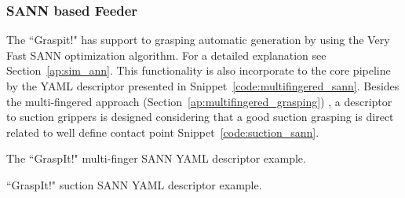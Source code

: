 \subsubsection{\acl{SANN} based Feeder}
\label{cap4:modular_grasping_architecture:sec:grasping_synthesis:subsec:graspit:subsubsec:sann}

The ``Graspit!" has support to grasping automatic generation by using the Very Fast \acl{SANN} optimization algorithm. For a detailed explanation see Section~\ref{ap:sim_ann}. This functionality is also incorporate to the core pipeline by the YAML descriptor presented in Snippet~\ref{code:multifingered_sann}. Besides the multi-fingered approach (Section~\ref{ap:multifingered_grasping}) , a descriptor to suction grippers is designed considering that a good suction grasping is direct related to well define contact point Snippet~\ref{code:suction_sann}.

\begin{snippet}[h!]
\centering
{}
\caption{The ``GraspIt!" multi-finger \ac{SANN} YAML descriptor example.}
\label{code:multifingered_sann}
\end{snippet}


\begin{snippet}[h!]
\centering
{}
\caption{``GraspIt!" suction \ac{SANN} YAML descriptor example.}
\label{code:suction_sann}
\end{snippet}

